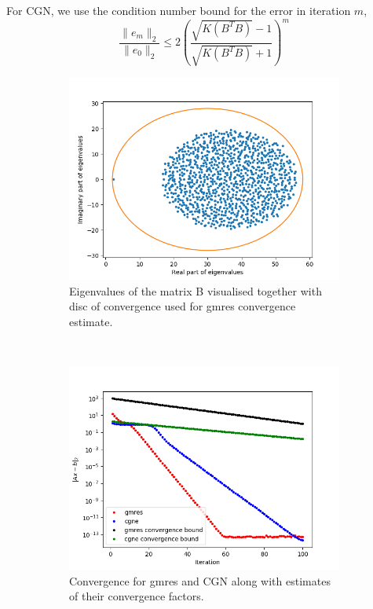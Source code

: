 For CGN, we use the condition number bound for the error in iteration $m$,
\begin{equation}
\frac{\|e_m\|_2}{\|e_0\|_2}\leq 2\left(\frac{\sqrt{K(B^TB)}-1}{\sqrt{K(B^TB)}+1}\right)^m
\end{equation}
\begin{figure}[h!]
	\centering
	\begin{subfigure}[t]{0.49\textwidth}
		\includegraphics[width=\textwidth]{Eigens.png}
		\caption{Eigenvalues of the matrix B visualised together with disc of convergence used for gmres convergence estimate.}
	\end{subfigure}~
	\begin{subfigure}[t]{0.49\textwidth}
		\includegraphics[width=\textwidth]{error_bound.png}
		\caption{Convergence for gmres and CGN along with estimates of their convergence factors.}
	\end{subfigure}
	\caption{}
	\label{task6b}
\end{figure}
